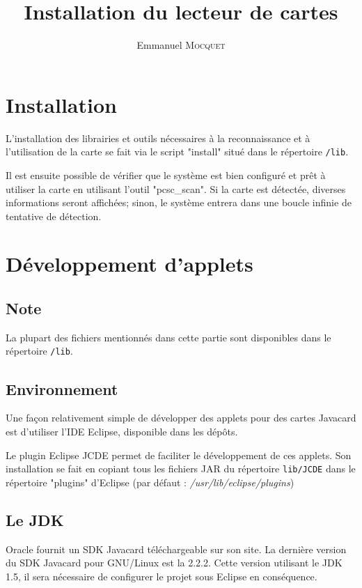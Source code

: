 \documentclass[a4paper,11pt,french]{article}
\title{Installation du lecteur de cartes}
\author{Emmanuel \textsc{Mocquet}}
\begin{document}
\maketitle

\section{Installation}
L'installation des librairies et outils nécessaires à la reconnaissance et
à l'utilisation de la carte se fait via le script "install" situé 
dans le répertoire \texttt{/lib}.

Il est ensuite possible de vérifier que le système est bien configuré et prêt
à utiliser la carte en utilisant l'outil "pcsc\_scan". Si la carte est détectée,
diverses informations seront affichées; sinon, le système entrera dans une boucle
infinie de tentative de détection.

\section{Développement d'applets}

\subsection{Note}
La plupart des fichiers mentionnés dans cette partie sont disponibles dans le 
répertoire \texttt{/lib}.

\subsection{Environnement}
Une façon relativement simple de développer des applets pour des cartes
Javacard est d'utiliser l'IDE Eclipse, disponible dans les dépôts. 

Le plugin Eclipse JCDE permet de faciliter le développement de ces applets. 
Son installation se fait en copiant tous les fichiers JAR du répertoire \texttt{lib/JCDE}
dans le répertoire "plugins" d'Eclipse (par défaut : \emph{/usr/lib/eclipse/plugins})


\subsection{Le JDK}
Oracle fournit un SDK Javacard téléchargeable sur son site.
La dernière version du SDK Javacard pour GNU/Linux est la 2.2.2. Cette version 
utilisant le JDK 1.5, il sera nécessaire de configurer le projet sous Eclipse en
conséquence.
\end{document}
